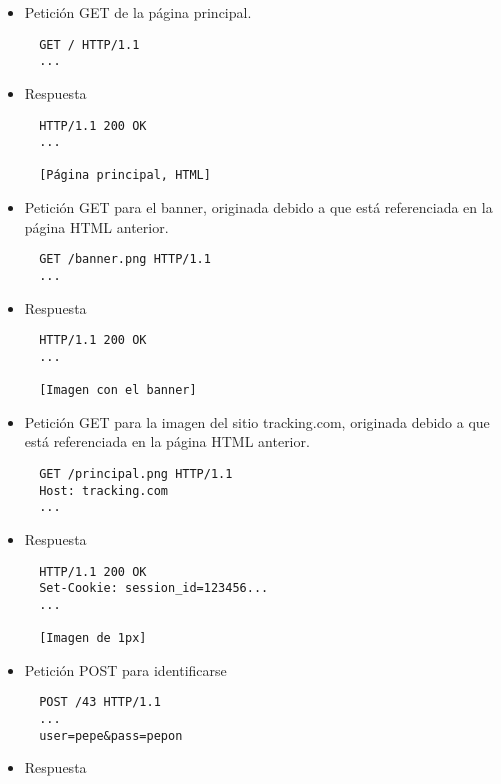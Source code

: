 \begin{itemize}

\item Petición GET de la página principal.

\begin{verbatim}
  GET / HTTP/1.1
  ...
\end{verbatim}

\item Respuesta

\begin{verbatim}
  HTTP/1.1 200 OK
  ...

  [Página principal, HTML]
\end{verbatim}


\item Petición GET para el banner, originada debido a que está referenciada en la página HTML anterior.

\begin{verbatim}
  GET /banner.png HTTP/1.1
  ...
\end{verbatim}

\item Respuesta

\begin{verbatim}
  HTTP/1.1 200 OK
  ...

  [Imagen con el banner]
\end{verbatim}

\item Petición GET para la imagen del sitio tracking.com, originada debido a que está referenciada en la página HTML anterior.

\begin{verbatim}
  GET /principal.png HTTP/1.1
  Host: tracking.com
  ...
\end{verbatim}

\item Respuesta

\begin{verbatim}
  HTTP/1.1 200 OK
  Set-Cookie: session_id=123456...
  ...

  [Imagen de 1px]
\end{verbatim}

\item Petición POST para identificarse

\begin{verbatim}
  POST /43 HTTP/1.1
  ...
  user=pepe&pass=pepon
\end{verbatim}

\item Respuesta


\end{itemize}
